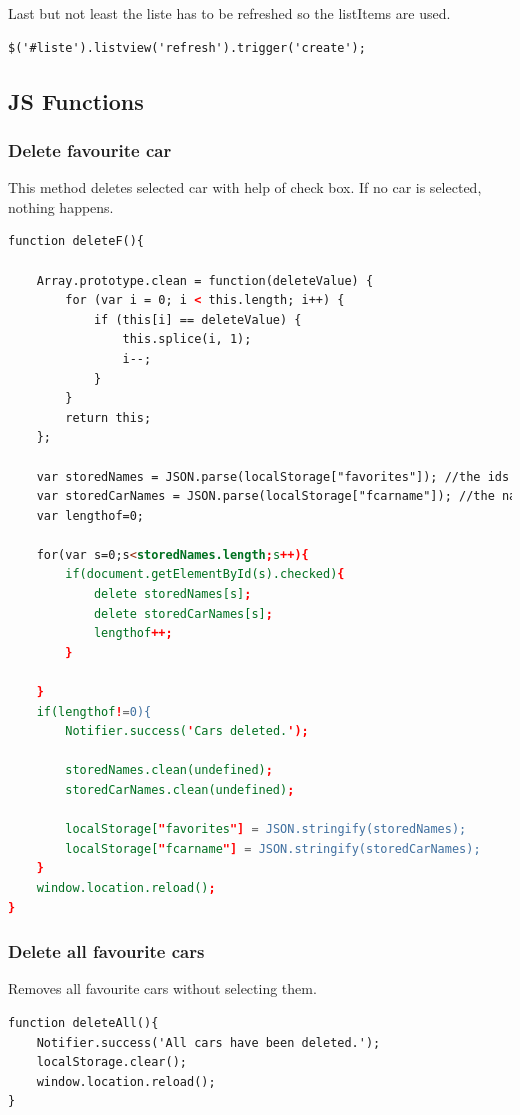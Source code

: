 Last but not least the liste has to be refreshed so the listItems are used. 
\\

\begin{lstlisting}[language=html, caption= 
start timer function,captionpos=b]
$('#liste').listview('refresh').trigger('create'); 
\end{lstlisting}

\subsection{JS Functions}
\subsubsection{Delete favourite car}
This method deletes selected car with help of check box. If no car is selected, nothing happens.
\\
\begin{lstlisting}[language=html, caption= 
start timer function,captionpos=b]
function deleteF(){
	
	Array.prototype.clean = function(deleteValue) {
  		for (var i = 0; i < this.length; i++) {
    		if (this[i] == deleteValue) {         
      			this.splice(i, 1);
				i--;
			}
		}
		return this;
	};
	
	var storedNames = JSON.parse(localStorage["favorites"]); //the ids of cars
    var storedCarNames = JSON.parse(localStorage["fcarname"]); //the names of cars
	var lengthof=0;

	for(var s=0;s<storedNames.length;s++){
		if(document.getElementById(s).checked){
			delete storedNames[s];
            delete storedCarNames[s];
			lengthof++;
		}
		
	}
	if(lengthof!=0){
		Notifier.success('Cars deleted.');
	
		storedNames.clean(undefined);
		storedCarNames.clean(undefined);

		localStorage["favorites"] = JSON.stringify(storedNames);
		localStorage["fcarname"] = JSON.stringify(storedCarNames);
	}
	window.location.reload();
}
\end{lstlisting}

\subsubsection{Delete all favourite cars}
Removes all favourite cars without selecting them.

\begin{lstlisting}[language=html, caption= 
start timer function,captionpos=b]
function deleteAll(){
    Notifier.success('All cars have been deleted.');
	localStorage.clear();
    window.location.reload();
}
\end{lstlisting}

